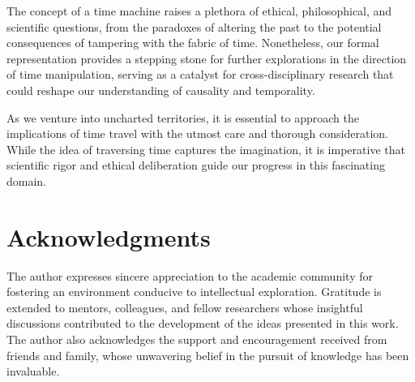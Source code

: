 \documentclass{article}
\begin{document}
The concept of a time machine raises a plethora of ethical, philosophical, and scientific questions, from the paradoxes of altering the past to the potential consequences of tampering with the fabric of time. Nonetheless, our formal representation provides a stepping stone for further explorations in the direction of time manipulation, serving as a catalyst for cross-disciplinary research that could reshape our understanding of causality and temporality.

As we venture into uncharted territories, it is essential to approach the implications of time travel with the utmost care and thorough consideration. While the idea of traversing time captures the imagination, it is imperative that scientific rigor and ethical deliberation guide our progress in this fascinating domain.

\section*{Acknowledgments}
The author expresses sincere appreciation to the academic community for fostering an environment conducive to intellectual exploration. Gratitude is extended to mentors, colleagues, and fellow researchers whose insightful discussions contributed to the development of the ideas presented in this work. The author also acknowledges the support and encouragement received from friends and family, whose unwavering belief in the pursuit of knowledge has been invaluable.
\end{document}
